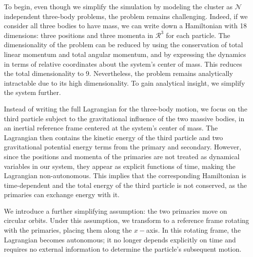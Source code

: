         To begin, even though we simplify the simulation by modeling the cluster as $\mathcal{N}$ independent three-body problems, the problem remains challenging. Indeed, if we consider all three bodies to have mass, we can write down a Hamiltonian with 18 dimensions: three positions and three momenta in $\mathcal{R}^3$ for each particle. The dimensionality of the problem can be reduced by using the conservation of total linear momentum and total angular momentum, and by expressing the dynamics in terms of relative coordinates about the system's center of mass. This reduces the total dimensionality to 9. Nevertheless, the problem remains analytically intractable due to its high dimensionality. To gain analytical insight, we simplify the system further.
        
        Instead of writing the full Lagrangian for the three-body motion, we focus on the third particle subject to the gravitational influence of the two massive bodies, in an inertial reference frame centered at the system's center of mass. The Lagrangian then contains the kinetic energy of the third particle and two gravitational potential energy terms from the primary and secondary. However, since the positions and momenta of the primaries are not treated as dynamical variables in our system, they appear as explicit functions of time, making the Lagrangian non-autonomous. This implies that the corresponding Hamiltonian is time-dependent and the total energy of the third particle is not conserved, as the primaries can exchange energy with it.

        We introduce a further simplifying assumption: the two primaries move on circular orbits. Under this assumption, we transform to a reference frame rotating with the primaries, placing them along the $x-$axis. In this rotating frame, the Lagrangian becomes autonomous; it no longer depends explicitly on time and requires no external information to determine the particle's subsequent motion.


